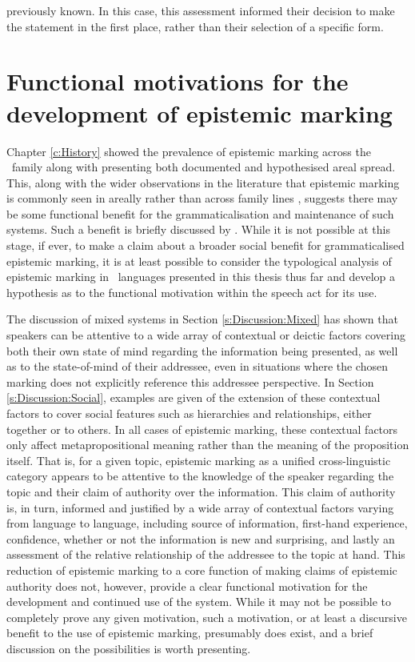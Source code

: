 previously known. In this case, this assessment informed their decision to make the statement in the first place, rather than their selection of a specific form.


\section{Functional motivations for the development of epistemic marking}\label{s:Discussion:Motivations}
Chapter \ref{c:History} showed the prevalence of epistemic marking across the \lfam\ family along with presenting both documented and hypothesised areal spread. This, along with the wider observations in the literature that epistemic marking is commonly seen in areally rather than across family lines \cite[228]{Aikhenvald2004}, suggests there may be some functional benefit for the grammaticalisation and maintenance of such systems. Such a benefit is briefly discussed by . While it is not possible at this stage, if ever, to make a claim about a broader social benefit for grammaticalised epistemic marking, it is at least possible to consider the typological analysis of epistemic marking in \lfam\ languages presented in this thesis thus far and develop a hypothesis as to the functional motivation within the speech act for its use.

The discussion of mixed systems in Section \ref{s:Discussion:Mixed} has shown that speakers can be attentive to a wide array of contextual or deictic factors covering both their own state of mind regarding the information being presented, as well as to the state-of-mind of their addressee, even in situations where the chosen marking does not explicitly reference this addressee perspective. In Section \ref{s:Discussion:Social}, examples are given of the extension of these contextual factors to cover social features such as hierarchies and relationships, either together or to others. In all cases of epistemic marking, these contextual factors only affect metapropositional meaning rather than the meaning of the proposition itself. That is, for a given topic, epistemic marking as a unified cross-linguistic category appears to be attentive to the knowledge of the speaker regarding the topic and their claim of authority over the information. This claim of authority is, in turn, informed and justified by a wide array of contextual factors varying from language to language, including source of information, first-hand experience, confidence, whether or not the information is new and surprising, and lastly an assessment of the relative relationship of the addressee to the topic at hand. This reduction of epistemic marking to a core function of making claims of epistemic authority does not, however, provide a clear functional motivation for the development and continued use of the system. While it may not be possible to completely prove any given motivation, such a motivation, or at least a discursive benefit to the use of epistemic marking, presumably does exist, and a brief discussion on the possibilities is worth presenting. 

